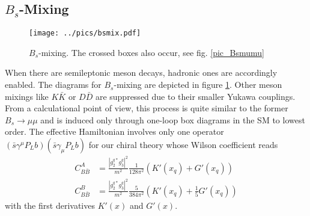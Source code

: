 \subsection{$B_s$-Mixing}
\begin{figure}[t]
 \texttt{[image: ../pics/bsmix.pdf]}
 \caption{$B_s$-mixing. The crossed boxes also occur, see fig. \ref{pic_Bsmumu}}
 \label{pic_Bsmix}
\end{figure}
When there are semileptonic meson decays, hadronic ones are accordingly enabled. The diagrams for $B_s$-mixing are depicted in figure \ref{pic_Bsmix}. Other
meson mixings like $K\bar K$ or $ D \bar D$ are suppressed due to their smaller Yukawa couplings. From a calculational point of view, this process is 
quite similar to the former $B_s\rightarrow \mu\mu$ and is induced only through one-loop box diagrams in the SM to lowest order. The effective Hamiltonian
involves only one operator $(\bar s \gamma^\mu P_L b)(\bar s \gamma_\mu P_L b)$ for our chiral theory whose Wilson coefficient reads
\begin{align}
 C_{B\bar B}^A &=  \frac{|g_2^{q*}g_3^q|^2}{m^2} \frac{1}{128\pi^2} \left(K'(x_q) + G'(x_q)\right)\\
 C_{B\bar B}^B &=  \frac{|g_2^{q*}g_3^q|^2}{m^2} \frac{5}{384\pi^2} \left(K'(x_q) + \frac15 G'(x_q)\right)
\end{align}
with the first derivatives $K'(x)$ and $G'(x)$. 

